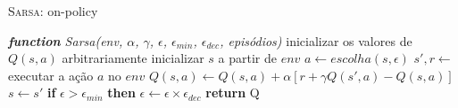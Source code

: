 \documentclass{beamer}
\begin{document}
\begin{frame}{\textsc{Sarsa}: on-policy}
\begin{algorithmic} 
	\STATE \emph{\textbf{function} Sarsa(env, $\alpha$, $\gamma$, $\epsilon$, $\epsilon_{min}$, $\epsilon_{dec}$, episódios)}
	\STATE inicializar os valores de $Q(s, a)$ arbitrariamente
	\STATE inicializar $s$ a partir de $env$
	\REPEAT
	\STATE $a \leftarrow escolha(s, \epsilon)$
	\STATE $s', r \leftarrow$ executar a ação $a$ no $env$
	\STATE \HiLi $Q(s,a) \leftarrow Q(s,a) + \alpha [r +\gamma Q(s', a) - Q(s,a)]$
	\STATE$s  \leftarrow s'$
	\STATE \textbf{if} $\epsilon > \epsilon_{min}$ \textbf{then} $\epsilon \leftarrow \epsilon \times \epsilon_{dec}$
	\ENDFOR
	\STATE \textbf{return} Q
\end{algorithmic}	
\end{frame}


%
%
\end{document}
